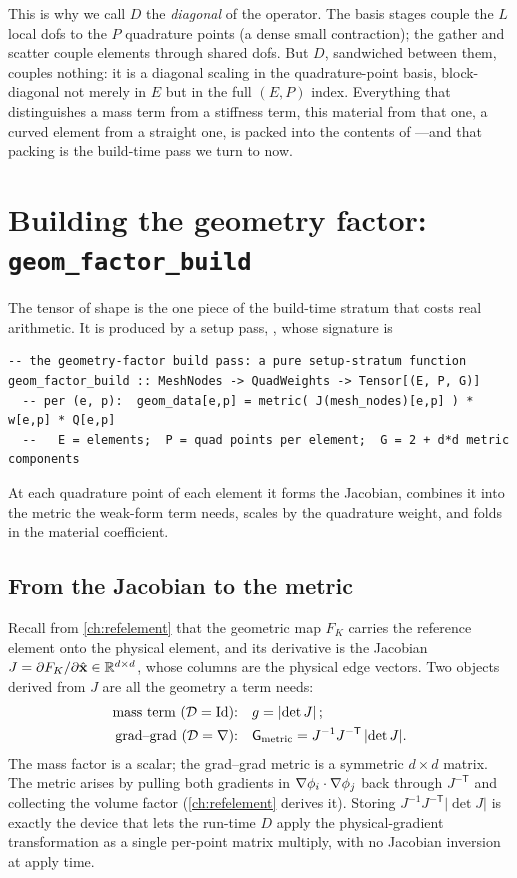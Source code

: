 This is why we call $D$ the \emph{diagonal} of the operator. The basis stages
couple the $L$ local dofs to the $P$ quadrature points (a dense small contraction);
the gather and scatter couple elements through shared dofs. But $D$, sandwiched
between them, couples nothing: it is a diagonal scaling in the quadrature-point
basis, block-diagonal not merely in $E$ but in the full $(E,P)$ index. Everything
that distinguishes a mass term from a stiffness term, this material from that one,
a curved element from a straight one, is packed into the contents of
---and that packing is the build-time pass we turn to now.

\section{Building the geometry factor: \texttt{geom\_factor\_build}}
\label{sec:appk-geom}

The tensor  of shape \code{[(E, P, G)]} is the one piece of the
build-time stratum that costs real arithmetic. It is produced by a setup pass,
, whose signature is
\begin{lstlisting}[style=l4style]
-- the geometry-factor build pass: a pure setup-stratum function
geom_factor_build :: MeshNodes -> QuadWeights -> Tensor[(E, P, G)]
  -- per (e, p):  geom_data[e,p] = metric( J(mesh_nodes)[e,p] ) * w[e,p] * Q[e,p]
  --   E = elements;  P = quad points per element;  G = 2 + d*d metric components
\end{lstlisting}
At each quadrature point of each element it forms the Jacobian, combines it into
the metric the weak-form term needs, scales by the quadrature weight, and folds in
the material coefficient.

\subsection{From the Jacobian to the metric}

Recall from \cref{ch:refelement} that the geometric map $F_K$ carries the reference
element onto the physical element, and its derivative is the Jacobian $J=\partial
F_K/\partial\hat{\mathbf{x}}\in\mathbb{R}^{d\times d}$, whose columns are the physical edge
vectors. Two objects derived from $J$ are all the geometry a term needs:
\begin{equation}
\begin{aligned}
  \text{mass term ($\mathcal{D}=\mathrm{Id}$):}\quad & g = \lvert\det J\rvert\,; \\
  \text{grad--grad ($\mathcal{D}=\nabla$):}\quad & \mathsf{G}_{\mathrm{metric}} = J^{-1}J^{-\mathsf T}\,\lvert\det J\rvert.
\end{aligned}
  \label{eq:appk-metric}
\end{equation}
The mass factor is a scalar; the grad--grad metric is a symmetric $d\times d$
matrix. The metric arises by pulling both gradients in $\nabla\phi_i\cdot\nabla\phi_j$
back through $J^{-\mathsf T}$ and collecting the volume factor (\cref{ch:refelement}
derives it). Storing $J^{-1}J^{-\mathsf T}|\det J|$ is exactly the device that lets
the run-time $D$ apply the physical-gradient transformation as a single per-point
matrix multiply, with no Jacobian inversion at apply time.

